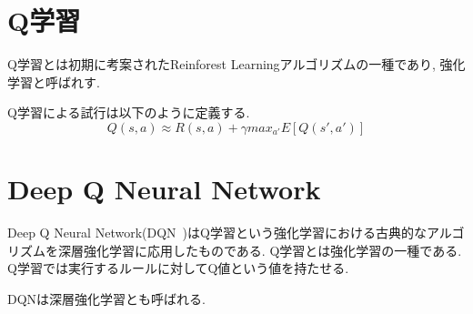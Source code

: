 \section{Q学習}

Q学習とは初期に考案されたReinforest Learningアルゴリズムの一種であり, 強化学習と呼ばれす.

Q学習による試行は以下のように定義する.
\begin{equation}
    Q(s, a) \approx R(s, a) + \gamma max_{a'} E[Q(s', a')]
\end{equation}

\section{Deep Q Neural Network}

Deep Q Neural Network(DQN~\cite{DQN})はQ学習という強化学習における古典的なアルゴリズムを深層強化学習に応用したものである.
Q学習とは強化学習の一種である. Q学習では実行するルールに対してQ値という値を持たせる.

DQNは深層強化学習とも呼ばれる.

